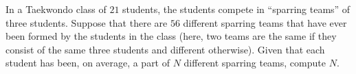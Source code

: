 In a Taekwondo class of $21$ students, the students compete in ``sparring teams'' of three students. Suppose that there are $56$ different sparring teams that have ever been formed by the students in the class (here, two teams are the same if they consist of the same three students and different otherwise). Given that each student has been, on average, a part of $N$ different sparring teams, compute $N$.